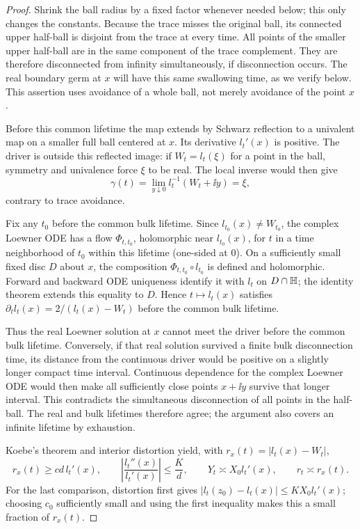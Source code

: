 \begin{proof}
Shrink the ball radius by a fixed factor whenever needed below; this
only changes the constants.  Because the trace misses the original
ball, its connected upper half-ball is disjoint from the trace at every
time.  All points of the smaller upper half-ball are in the same
component of the trace complement.  They are therefore disconnected
from infinity simultaneously, if disconnection occurs.  The real
boundary germ at $x$ will have this same swallowing time, as we verify
below.  This assertion uses avoidance of a whole ball, not merely
avoidance of the point $x$.

Before this common lifetime the map extends by Schwarz reflection to a
univalent map on a smaller full ball centered at $x$.  Its derivative
$l_t'(x)$ is positive.  The driver is outside this reflected image:
if $W_t=l_t(\xi)$ for a point in the ball, symmetry and univalence
force $\xi$ to be real.  The local inverse would then give
\[
 \gamma(t)=\lim_{y\downarrow0}l_t^{-1}(W_t+\ii y)=\xi,
\]
contrary to trace avoidance.

Fix any $t_0$ before the common bulk lifetime. Since
$l_{t_0}(x)\ne W_{t_0}$, the complex Loewner ODE has a flow
$\Phi_{t,t_0}$, holomorphic near $l_{t_0}(x)$, for $t$ in a time
neighborhood of $t_0$ within this lifetime (one-sided at $0$).
On a sufficiently small fixed disc $D$ about $x$, the composition
$\Phi_{t,t_0}\circ l_{t_0}$ is defined and holomorphic.
Forward and backward ODE uniqueness identify it with $l_t$ on
$D\cap\mathbb H$; the identity theorem extends this equality to $D$.
Hence $t\mapsto l_t(x)$ satisfies
$\partial_t l_t(x)=2/(l_t(x)-W_t)$ before the common bulk lifetime.

Thus the real Loewner solution at $x$
cannot meet the driver before the common bulk lifetime.  Conversely,
if that real solution survived a finite bulk disconnection time, its
distance from the continuous driver would be positive on a slightly
longer compact time interval.  Continuous dependence for the complex
Loewner ODE would then make all sufficiently close points $x+\ii y$
survive that longer interval.  This contradicts the simultaneous
disconnection of all points in the half-ball.  The real and bulk
lifetimes therefore agree; the argument also covers an infinite
lifetime by exhaustion.

Koebe's theorem and
interior distortion yield, with
$r_x(t)=|l_t(x)-W_t|$,
\begin{equation}\label{eng:reflection-distortion}
 r_x(t)\ge c d\,l_t'(x),\qquad
 \left|\frac{l_t''(x)}{l_t'(x)}\right|\le\frac Kd,
 \qquad
 Y_t\asymp X_0l_t'(x),\qquad r_t\asymp r_x(t).
\end{equation}
For the last comparison, distortion first gives
$|l_t(z_0)-l_t(x)|\le KX_0l_t'(x)$; choosing $c_0$ sufficiently small
and using the first inequality makes this a small fraction of $r_x(t)$.


\end{proof}
